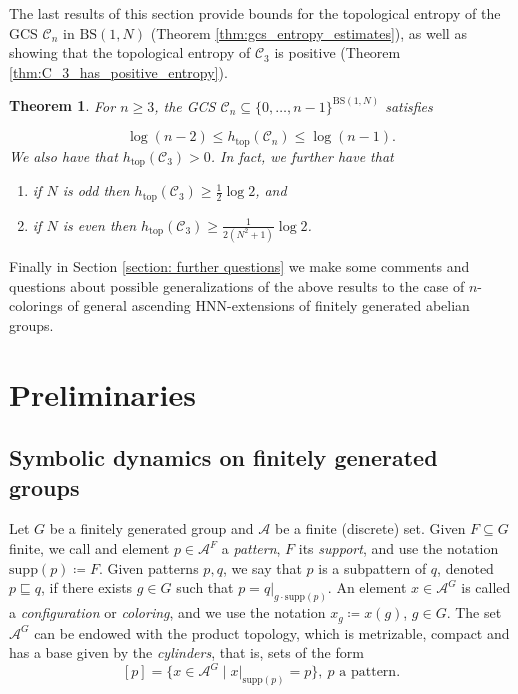 \documentclass[cupthm,crop,info]{CUP-JNL-ETS}%
\theoremstyle{cupplain}
\newtheorem{theorem}{Theorem}[section]
\theoremstyle{cupdefinition}
\theoremstyle{cupremark}
\theoremstyle{cupproof}
\numberwithin{equation}{section}
\newcommand{\BS}[1][N]{\mathrm{BS}(1,#1)}
\def\htop{h_{\mathrm{top}}}
\begin{document}
The last results of this section provide bounds for the topological entropy of the GCS $\mathcal{C}_n$ in $\BS$ (Theorem \ref{thm:gcs_entropy_estimates}), as well as showing that the topological entropy of $\mathcal{C}_3$ is positive (Theorem \ref{thm:C_3_has_positive_entropy}).
\begin{theorem} \label{thm:summary_gcs_entropy}
	For $n\ge 3$, the GCS $\mathcal{C}_n\subseteq\{0,\ldots,n-1\}^{\BS}$ satisfies
	
	$$
	\log(n-2)\le\htop(\mathcal{C}_n)\le\log(n-1).
	$$
	We also have that $\htop(\mathcal{C}_3)>0$. In fact, we further have that
	\begin{enumerate}
		\item if $N$ is odd then $\htop(\mathcal{C}_3)\ge\frac{1}{2}\log 2$, and
		\item if $N$ is even then $\htop(\mathcal{C}_3)\ge\frac{1}{2(N^2+1)}\log 2$.
	\end{enumerate}
\end{theorem}

Finally in Section \ref{section: further questions} we make some comments and questions about possible generalizations of the above results to the case of $n$-colorings of general ascending HNN-extensions of finitely generated abelian groups.




\section{Preliminaries}\label{section:preliminaries}

\subsection{Symbolic dynamics on finitely generated groups}
Let $G$ be a finitely generated group and $\mathcal{A}$ be a finite (discrete) set. Given $F\subseteq G$ finite, we call and element $p\in \mathcal{A}^{F}$ a \textit{pattern}, $F$ its \textit{support}, and use the notation $\mathrm{supp}(p)\coloneqq F$. Given patterns $p,q$, we say that $p$ is a subpattern of $q$, denoted $p\sqsubseteq q$, if there exists $g\in G$ such that $p=q|_{g\cdot \mathrm{supp}(p)}$. An element $x\in \mathcal{A}^G$ is called a \textit{configuration} or \textit{coloring}, and we use the notation $x_g\coloneqq x(g)$, $g\in G$. The set $\mathcal{A}^G$ can be endowed with the product topology, which is metrizable, compact and has a base given by the \textit{cylinders}, that is, sets of the form
$$
[p]=\{x\in \mathcal{A}^G\mid x|_{\mathrm{supp}(p)}=p \}, \ p\text{ a pattern}.
$$ 
\end{document}
